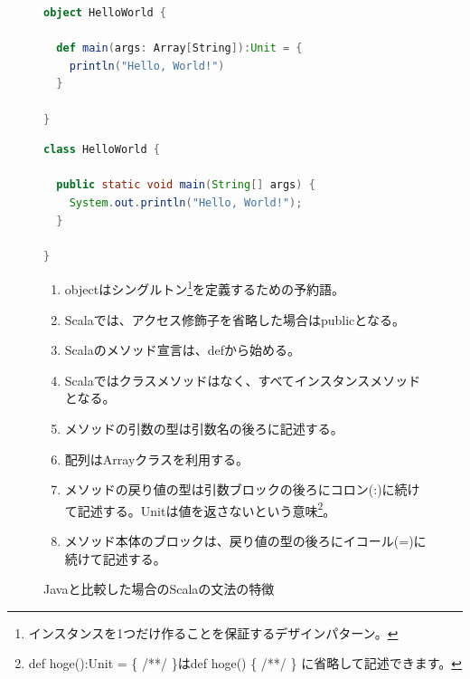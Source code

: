 \begin{figure}[h]
  \caption{Javaと比較した場合のScalaの文法の特徴}
  \label{fig:java_vs_scala_helloworld}

\begin{minipage}[t]{0.45\textwidth}
\begin{lstlisting}[language=scala]
object HelloWorld {

  def main(args: Array[String]):Unit = {
    println("Hello, World!")
  }

}
\end{lstlisting}%
\end{minipage}%
\hfill
\begin{minipage}[t]{0.45\textwidth}
\begin{lstlisting}[language=java]
class HelloWorld {

  public static void main(String[] args) {
    System.out.println("Hello, World!");
  }

}
\end{lstlisting}%
\end{minipage}%

\begin{screen}
\begin{enumerate}
\item objectはシングルトン\footnote{インスタンスを1つだけ作ることを保証するデザインパターン。}を定義するための予約語。
\item Scalaでは、アクセス修飾子を省略した場合はpublicとなる。
\item Scalaのメソッド宣言は、defから始める。
\item Scalaではクラスメソッドはなく、すべてインスタンスメソッドとなる。
\item メソッドの引数の型は引数名の後ろに記述する。
\item 配列はArrayクラスを利用する。
\item メソッドの戻り値の型は引数ブロックの後ろにコロン(:)に続けて記述する。Unitは値を返さないという意味\footnote{def hoge():Unit = \{ /**/ \}はdef hoge() \{ /**/ \} に省略して記述できます。}。
\item メソッド本体のブロックは、戻り値の型の後ろにイコール(=)に続けて記述する。
\end{enumerate}
\end{screen}

\end{figure}
